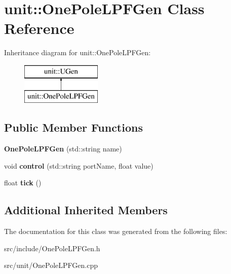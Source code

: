 \hypertarget{classunit_1_1OnePoleLPFGen}{\section{unit\-:\-:One\-Pole\-L\-P\-F\-Gen Class Reference}
\label{classunit_1_1OnePoleLPFGen}
}
Inheritance diagram for unit\-:\-:One\-Pole\-L\-P\-F\-Gen\-:\begin{figure}[H]
\begin{center}
\leavevmode
\includegraphics[height=2.000000cm]{classunit_1_1OnePoleLPFGen}
\end{center}
\end{figure}
\subsection*{Public Member Functions}
\begin{DoxyCompactItemize}
\item 
\hypertarget{classunit_1_1OnePoleLPFGen_aea39a9562852ac47fdd576fd8b583b9f}{{\bfseries One\-Pole\-L\-P\-F\-Gen} (std\-::string name)}\label{classunit_1_1OnePoleLPFGen_aea39a9562852ac47fdd576fd8b583b9f}

\item 
\hypertarget{classunit_1_1OnePoleLPFGen_a8f2df9b7406edadf7dc34e7e65b2b67c}{void {\bfseries control} (std\-::string port\-Name, float value)}\label{classunit_1_1OnePoleLPFGen_a8f2df9b7406edadf7dc34e7e65b2b67c}

\item 
\hypertarget{classunit_1_1OnePoleLPFGen_a5e5288841ff8112113f2d6ec1f03f375}{float {\bfseries tick} ()}\label{classunit_1_1OnePoleLPFGen_a5e5288841ff8112113f2d6ec1f03f375}

\end{DoxyCompactItemize}
\subsection*{Additional Inherited Members}


The documentation for this class was generated from the following files\-:\begin{DoxyCompactItemize}
\item 
src/include/One\-Pole\-L\-P\-F\-Gen.\-h\item 
src/unit/One\-Pole\-L\-P\-F\-Gen.\-cpp\end{DoxyCompactItemize}
